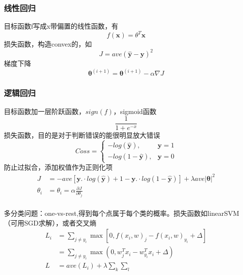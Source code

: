 \documentclass[UTF8]{../computerUniverse}
\begin{document}
\subsubsection{线性回归}
目标函数f写成x带偏置的线性函数，有
\begin{equation}
f(\mathbf x)=\theta ^T \mathbf x
\end{equation}
损失函数，构造convex的，如
\begin{equation}
J= ave (\hat {\mathbf y}-\mathbf y)^2
\end{equation}
梯度下降
\begin{equation}
\mathbf \theta ^{(i+1)}=\mathbf \theta ^{(i+1)}-\alpha \nabla J
\end{equation}
 
\subsubsection{逻辑回归}
目标函数加一层阶跃函数，$sign(f)$，sigmoid函数
\begin{equation}
\frac{1}{1+e^{-x}}
\end{equation}
 损失函数，目的是对于判断错误的能很明显放大错误
\begin{equation}
Coss= \left\{
    \begin{aligned}
    -log(\hat {\mathbf y}),&\mathbf y=1\\
    -log(1-\hat {\mathbf y}),&\mathbf y=0
    \end{aligned}
    \right.
\end{equation}
防止过拟合，添加权值作为正则化项
\begin{equation}
    \begin{split}
    J&=-ave \left[
    {\mathbf y}.\cdot log(\hat {\mathbf y})
    +{1-\mathbf y}.\cdot log(1-\hat {\mathbf y})
\right]+\lambda ave|\mathbf \theta   |^2\\
        \theta_i&=\theta_i =\alpha \frac{\partial J}{\partial \theta_j}\\
    \end{split}
\end{equation}
 
多分类问题：one-vs-rest,得到每个点属于每个类的概率。损失函数如linearSVM（可用SGD求解），或者交叉熵
\begin{equation}
\begin{split}
    L_i & = \sum_{j\neq y_i} \max \left[ 0,f(x_i,w)_j-f(x_i,w)_{y_i}+\Delta  \right]\\
    &=\sum_{j \neq y_i} \max \left( 0,w_j^Tx_i-w_{y_i}^Tx_i +\Delta \right)\\
    L& = ave(L_i)+\lambda\sum_k \sum_l
\end{split}
\end{equation}
\end{document}
